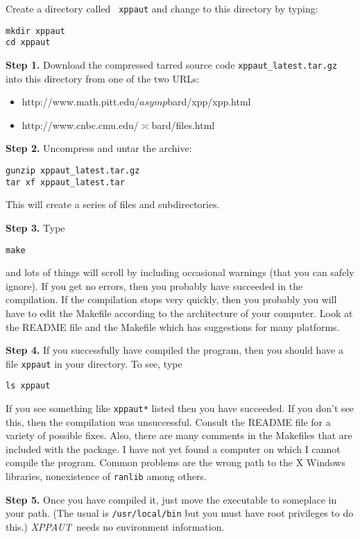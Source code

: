 \documentclass{article}
\newcommand{\XPP}{{\sl XPPAUT\, }}
\begin{document}
\begin{description}
\item Create a directory called {\tt
xppaut} and change to this directory by typing:
\begin{verbatim}
mkdir xppaut
cd xppaut
\end{verbatim}
\item{\bf Step 1.} Download the compressed tarred
source code {\tt xppaut\_latest.tar.gz} into this directory
 from one of the two URLs:
\begin{itemize}
\item http://www.math.pitt.edu/$asymp$bard/xpp/xpp.html
\item http://www.cnbc.cmu.edu/$\asymp$bard/files.html
\end{itemize}
\item{\bf Step 2.} Uncompress and untar the archive:
\begin{verbatim}
gunzip xppaut_latest.tar.gz
tar xf xppaut_latest.tar
\end{verbatim}
This will create a series of files and subdirectories.
\item{\bf Step 3.}  Type
\begin{verbatim}
make
\end{verbatim}
and lots of things will scroll by including occasional warnings (that you
can safely ignore).  If you get no errors, then you probably have
succeeded in the compilation. If the compilation stops very quickly,
then you probably you will have to edit the Makefile according to the
architecture of your computer.  Look at the README file and the
Makefile which has suggestions for many platforms. 
\item{\bf Step 4.} If you successfully have compiled the program, then you should have a
file {\tt xppaut} in your directory. To see, type
\begin{verbatim}
ls xppaut
\end{verbatim}
If you see something like {\tt xppaut*} listed then you have
succeeded. If you don't see this, then the compilation was
unsuccessful. Consult the README file for a variety of possible
fixes. Also, there are many comments in the Makefiles that are
included with the package. 
I have not yet found a computer on which I cannot compile the
program. Common problems are the wrong path to the X Windows
libraries, nonexistence of {\tt ranlib} among others. 
\item{\bf Step 5.} Once you have
compiled it, just move the executable to someplace in your path. (The
usual is {\tt /usr/local/bin} but you must have root privileges to do
this.) \XPP needs no environment information.
\end{description}
\end{document}
